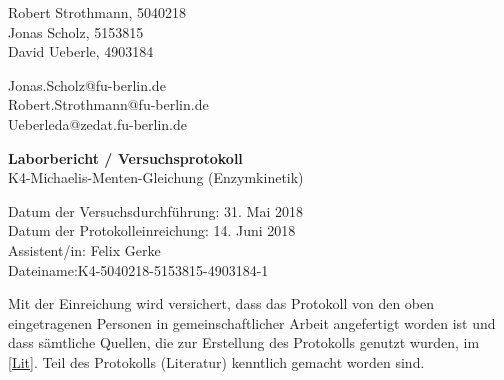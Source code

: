 
\thispagestyle{empty}

\begin{flushleft}
Robert Strothmann, 5040218\\ 
Jonas Scholz, 5153815\\ 
David Ueberle, 4903184\\ 
\end{flushleft}
\vspace*{0.3cm}
Jonas.Scholz@fu-berlin.de\\
Robert.Strothmann@fu-berlin.de\\
Ueberleda@zedat.fu-berlin.de\\
\begin{center}
	\vspace*{1cm}
	\Large
	{ \bfseries Laborbericht / Versuchsprotokoll}\\
	\vspace*{1cm}
	{K4-Michaelis-Menten-Gleichung (Enzymkinetik)}\\
\end{center}
	\vspace*{1cm}
	{Datum der Versuchsdurchführung: 31. Mai 2018}\\
	{Datum der Protokolleinreichung:  14. Juni 2018}\\
	{Assistent/in: Felix Gerke}\\
	{Dateiname:K4-5040218-5153815-4903184-1}	
	\vfill
\begin{flushleft}
Mit der Einreichung wird versichert, dass das Protokoll von den oben eingetragenen Personen in gemeinschaftlicher Arbeit angefertigt worden ist und dass sämtliche Quellen, die zur Erstellung des Protokolls genutzt wurden, im \ref{Lit}. Teil des Protokolls (Literatur) kenntlich gemacht worden sind.
\end{flushleft}

\normalsize
\newpage
%